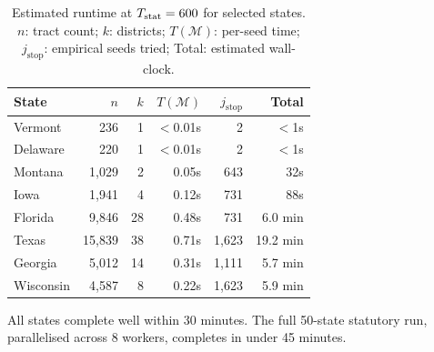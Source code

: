 \begin{table}[h]
\centering
\caption{Estimated \cs{} runtime at $T_{\mathrm{stat}} = 600$ for selected states.
         $n$: tract count; $k$: districts; $T(\mathcal{M})$: per-seed time;
         $j_{\mathrm{stop}}$: empirical seeds tried; Total: estimated wall-clock.}
\label{tab:runtime}
\begin{tabular}{lrrrrr}
\toprule
\textbf{State} & $n$ & $k$ & $T(\mathcal{M})$ & $j_{\mathrm{stop}}$ & \textbf{Total} \\
\midrule
Vermont   &   236 &  1 & $<$0.01s & 2   & $<$1s    \\
Delaware  &   220 &  1 & $<$0.01s & 2   & $<$1s    \\
Montana   & 1,029 &  2 & 0.05s    & 643 & 32s      \\
Iowa      & 1,941 &  4 & 0.12s    & 731 & 88s      \\
Florida   & 9,846 & 28 & 0.48s    & 731 & 6.0 min  \\
Texas     &15,839 & 38 & 0.71s    &1,623& 19.2 min \\
Georgia   & 5,012 & 14 & 0.31s    &1,111& 5.7 min  \\
Wisconsin & 4,587 &  8 & 0.22s    &1,623& 5.9 min  \\
\bottomrule
\end{tabular}
\end{table}

All states complete well within 30 minutes.
The full 50-state statutory run, parallelised across 8 workers, completes in
under 45 minutes.
